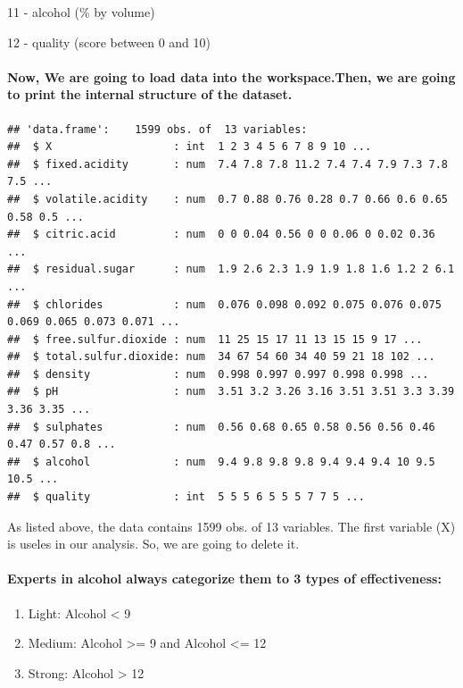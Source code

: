 \documentclass[]{article}
\let\oldparagraph\paragraph
\renewcommand{\paragraph}[1]{\oldparagraph{#1}\mbox{}}
\begin{document}
11 - alcohol (\% by volume)

12 - quality (score between 0 and 10)

\paragraph{Now, We are going to load data into the workspace.Then, we
are going to print the internal structure of the
dataset.}\label{now-we-are-going-to-load-data-into-the-workspace.then-we-are-going-to-print-the-internal-structure-of-the-dataset.}

\begin{verbatim}
## 'data.frame':    1599 obs. of  13 variables:
##  $ X                   : int  1 2 3 4 5 6 7 8 9 10 ...
##  $ fixed.acidity       : num  7.4 7.8 7.8 11.2 7.4 7.4 7.9 7.3 7.8 7.5 ...
##  $ volatile.acidity    : num  0.7 0.88 0.76 0.28 0.7 0.66 0.6 0.65 0.58 0.5 ...
##  $ citric.acid         : num  0 0 0.04 0.56 0 0 0.06 0 0.02 0.36 ...
##  $ residual.sugar      : num  1.9 2.6 2.3 1.9 1.9 1.8 1.6 1.2 2 6.1 ...
##  $ chlorides           : num  0.076 0.098 0.092 0.075 0.076 0.075 0.069 0.065 0.073 0.071 ...
##  $ free.sulfur.dioxide : num  11 25 15 17 11 13 15 15 9 17 ...
##  $ total.sulfur.dioxide: num  34 67 54 60 34 40 59 21 18 102 ...
##  $ density             : num  0.998 0.997 0.997 0.998 0.998 ...
##  $ pH                  : num  3.51 3.2 3.26 3.16 3.51 3.51 3.3 3.39 3.36 3.35 ...
##  $ sulphates           : num  0.56 0.68 0.65 0.58 0.56 0.56 0.46 0.47 0.57 0.8 ...
##  $ alcohol             : num  9.4 9.8 9.8 9.8 9.4 9.4 9.4 10 9.5 10.5 ...
##  $ quality             : int  5 5 5 6 5 5 5 7 7 5 ...
\end{verbatim}

As listed above, the data contains 1599 obs. of 13 variables. The first
variable (X) is useles in our analysis. So, we are going to delete it.

\paragraph{Experts in alcohol always categorize them to 3 types of
effectiveness:}\label{experts-in-alcohol-always-categorize-them-to-3-types-of-effectiveness}

\begin{enumerate}
\def\labelenumi{\arabic{enumi}.}
\item
  Light: Alcohol \textless{} 9
\item
  Medium: Alcohol \textgreater{}= 9 and Alcohol \textless{}= 12
\item
  Strong: Alcohol \textgreater{} 12
\end{enumerate}
\end{document}
